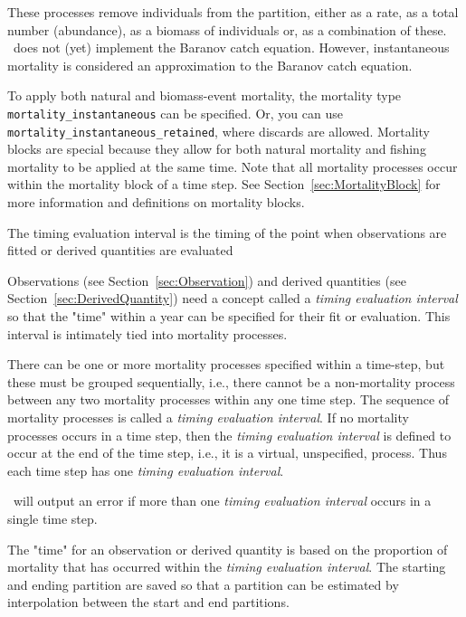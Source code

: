 These processes remove individuals from the partition, either as a rate, as a total number (abundance), as a biomass of individuals or, as a combination of these. \CNAME\ does not (yet) implement the Baranov catch equation. However, instantaneous mortality is considered an approximation to the Baranov catch equation.

To apply both natural and biomass-event mortality, the mortality type \texttt{mortality\_instantaneous} can be specified. Or, you can use \texttt{mortality\_instantaneous\_retained}, where discards are allowed. Mortality blocks are special because they allow for both natural mortality and fishing mortality to be applied at the same time. Note that all mortality processes occur within the mortality block of a time step. See Section~\ref{sec:MortalityBlock} for more information and definitions on mortality blocks.

\textbf{}

The timing evaluation interval is the timing of the point when observations are fitted or derived quantities are evaluated \label{sec:MortalityBlock}\label{sec:TimingEvaluationInterval}


Observations (see Section~\ref{sec:Observation})  and derived quantities (see Section~\ref{sec:DerivedQuantity}) need a concept called a \emph{timing evaluation interval} so that the "time" within a year can be specified for their fit or evaluation. This interval is intimately tied into mortality processes.

There can be one or more mortality processes specified within a time-step, but these must be grouped sequentially, i.e., there cannot be a non-mortality process between any two mortality processes within any one time step. The sequence of mortality processes is called a \emph{timing evaluation interval}. If no mortality processes occurs in a time step, then the \emph{timing evaluation interval} is defined to occur at the end of the time step, i.e., it is a virtual, unspecified,  process. Thus  each time step has one \emph{timing evaluation interval}.

\CNAME\ will output an error if more than one \textit{timing evaluation interval} occurs in a single time step.

The "time" for an observation or derived quantity is based on the proportion of mortality that has occurred within the \textit{timing evaluation interval}. The starting and ending partition are saved so that a partition can be estimated by  interpolation between the start and end partitions.

